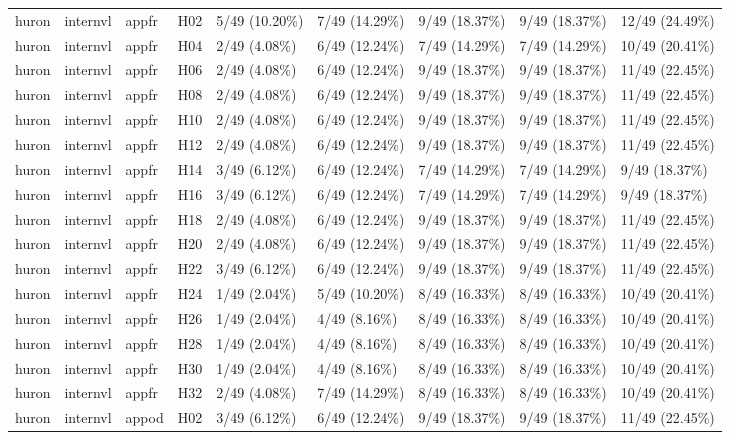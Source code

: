 \begin{longtable}{lllllllll}
huron & internvl & appfr & H02 & 5/49 (10.20\%) & 7/49 (14.29\%) & 9/49 (18.37\%) & 9/49 (18.37\%) & 12/49 (24.49\%) \\
huron & internvl & appfr & H04 & 2/49 (4.08\%) & 6/49 (12.24\%) & 7/49 (14.29\%) & 7/49 (14.29\%) & 10/49 (20.41\%) \\
huron & internvl & appfr & H06 & 2/49 (4.08\%) & 6/49 (12.24\%) & 9/49 (18.37\%) & 9/49 (18.37\%) & 11/49 (22.45\%) \\
huron & internvl & appfr & H08 & 2/49 (4.08\%) & 6/49 (12.24\%) & 9/49 (18.37\%) & 9/49 (18.37\%) & 11/49 (22.45\%) \\
huron & internvl & appfr & H10 & 2/49 (4.08\%) & 6/49 (12.24\%) & 9/49 (18.37\%) & 9/49 (18.37\%) & 11/49 (22.45\%) \\
huron & internvl & appfr & H12 & 2/49 (4.08\%) & 6/49 (12.24\%) & 9/49 (18.37\%) & 9/49 (18.37\%) & 11/49 (22.45\%) \\
huron & internvl & appfr & H14 & 3/49 (6.12\%) & 6/49 (12.24\%) & 7/49 (14.29\%) & 7/49 (14.29\%) & 9/49 (18.37\%) \\
huron & internvl & appfr & H16 & 3/49 (6.12\%) & 6/49 (12.24\%) & 7/49 (14.29\%) & 7/49 (14.29\%) & 9/49 (18.37\%) \\
huron & internvl & appfr & H18 & 2/49 (4.08\%) & 6/49 (12.24\%) & 9/49 (18.37\%) & 9/49 (18.37\%) & 11/49 (22.45\%) \\
huron & internvl & appfr & H20 & 2/49 (4.08\%) & 6/49 (12.24\%) & 9/49 (18.37\%) & 9/49 (18.37\%) & 11/49 (22.45\%) \\
huron & internvl & appfr & H22 & 3/49 (6.12\%) & 6/49 (12.24\%) & 9/49 (18.37\%) & 9/49 (18.37\%) & 11/49 (22.45\%) \\
huron & internvl & appfr & H24 & 1/49 (2.04\%) & 5/49 (10.20\%) & 8/49 (16.33\%) & 8/49 (16.33\%) & 10/49 (20.41\%) \\
huron & internvl & appfr & H26 & 1/49 (2.04\%) & 4/49 (8.16\%) & 8/49 (16.33\%) & 8/49 (16.33\%) & 10/49 (20.41\%) \\
huron & internvl & appfr & H28 & 1/49 (2.04\%) & 4/49 (8.16\%) & 8/49 (16.33\%) & 8/49 (16.33\%) & 10/49 (20.41\%) \\
huron & internvl & appfr & H30 & 1/49 (2.04\%) & 4/49 (8.16\%) & 8/49 (16.33\%) & 8/49 (16.33\%) & 10/49 (20.41\%) \\
huron & internvl & appfr & H32 & 2/49 (4.08\%) & 7/49 (14.29\%) & 8/49 (16.33\%) & 8/49 (16.33\%) & 10/49 (20.41\%) \\
huron & internvl & appod & H02 & 3/49 (6.12\%) & 6/49 (12.24\%) & 9/49 (18.37\%) & 9/49 (18.37\%) & 11/49 (22.45\%) \\

\end{longtable}
